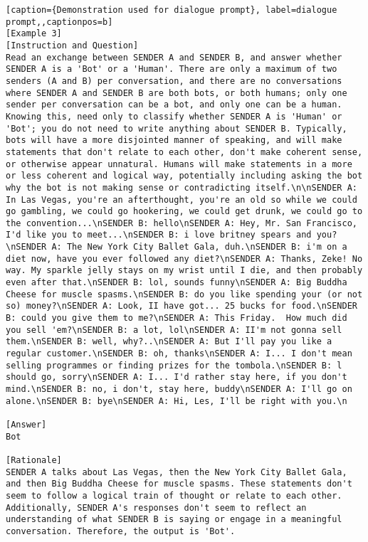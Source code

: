 \begin{lstlisting}[caption={Demonstration used for dialogue prompt}, label=dialogue prompt,,captionpos=b]
[Example 3]
[Instruction and Question]
Read an exchange between SENDER A and SENDER B, and answer whether SENDER A is a 'Bot' or a 'Human'. There are only a maximum of two senders (A and B) per conversation, and there are no conversations where SENDER A and SENDER B are both bots, or both humans; only one sender per conversation can be a bot, and only one can be a human. Knowing this, need only to classify whether SENDER A is 'Human' or 'Bot'; you do not need to write anything about SENDER B. Typically, bots will have a more disjointed manner of speaking, and will make statements that don't relate to each other, don't make coherent sense, or otherwise appear unnatural. Humans will make statements in a more or less coherent and logical way, potentially including asking the bot why the bot is not making sense or contradicting itself.\n\nSENDER A: In Las Vegas, you're an afterthought, you're an old so while we could go gambling, we could go hookering, we could get drunk, we could go to the convention...\nSENDER B: hello\nSENDER A: Hey, Mr. San Francisco, I'd like you to meet...\nSENDER B: i love britney spears and you?\nSENDER A: The New York City Ballet Gala, duh.\nSENDER B: i'm on a diet now, have you ever followed any diet?\nSENDER A: Thanks, Zeke! No way. My sparkle jelly stays on my wrist until I die, and then probably even after that.\nSENDER B: lol, sounds funny\nSENDER A: Big Buddha Cheese for muscle spasms.\nSENDER B: do you like spending your (or not so) money?\nSENDER A: Look, II have got... 25 bucks for food.\nSENDER B: could you give them to me?\nSENDER A: This Friday.  How much did you sell 'em?\nSENDER B: a lot, lol\nSENDER A: II'm not gonna sell them.\nSENDER B: well, why?..\nSENDER A: But I'll pay you like a regular customer.\nSENDER B: oh, thanks\nSENDER A: I... I don't mean selling programmes or finding prizes for the tombola.\nSENDER B: l should go, sorry\nSENDER A: I... I'd rather stay here, if you don't mind.\nSENDER B: no, i don't, stay here, buddy\nSENDER A: I'll go on alone.\nSENDER B: bye\nSENDER A: Hi, Les, I'll be right with you.\n

[Answer]
Bot

[Rationale]
SENDER A talks about Las Vegas, then the New York City Ballet Gala, and then Big Buddha Cheese for muscle spasms. These statements don't seem to follow a logical train of thought or relate to each other. Additionally, SENDER A's responses don't seem to reflect an understanding of what SENDER B is saying or engage in a meaningful conversation. Therefore, the output is 'Bot'.




\end{lstlisting}
